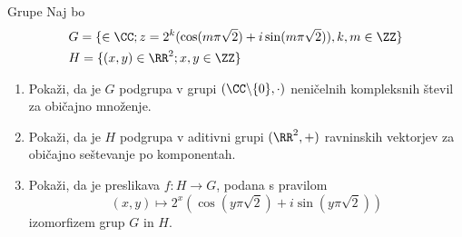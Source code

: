 \begin{frame}{Grupe}
	Naj bo
\begin{align*}
		 &G = \{ \in \CC; z = 2^k (\cos(m\pi \sqrt{2})+ i \sin(m\pi\sqrt{2})),k,m \in \ZZ \} \\
		 &H = \{ (x,y) \in \RR^2; x,y \in \ZZ \} 
\end{align*}
	\begin{enumerate}
		\item
			Pokaži, da je $G$ podgrupa v grupi $(\CC \backslash \{0\}, \cdot) $
			neničelnih kompleksnih števil za običajno množenje.
		\item
			Pokaži, da je $H$ podgrupa v aditivni grupi $ (\RR^2, +)$
			ravninskih vektorjev za običajno seštevanje po komponentah.
		\item
			Pokaži, da je preslikava $f:H\to G$, podana s pravilom
			$$ (x,y) \mapsto 2^x(\cos(y\pi\sqrt{2})+i \sin(y\pi\sqrt{2})) $$
			izomorfizem grup $G$ in $H$.
	\end{enumerate}
\end{frame}
